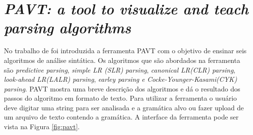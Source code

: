
\section{\textit{PAVT: a tool to visualize and teach parsing algorithms}}
No trabalho de \textcite{sangal2018pavt} foi introduzida a ferramenta PAVT com o objetivo de ensinar seis algoritmos de análise sintática. Os algoritmos que são abordados na ferramenta são \textit{predictive parsing}, \textit{simple LR (SLR) parsing}, \textit{canonical LR(CLR) parsing}, \textit{look-ahead LR(LALR) parsing}, \textit{earley parsing e Cocke-Younger-Kasami(CYK) parsing}. PAVT mostra uma breve descrição dos algoritmos e dá o resultado dos passos do algoritmo em formato de texto. Para utilizar a ferramenta o usuário deve digitar uma string para ser analisada e a gramática alvo ou fazer upload de um arquivo de texto contendo a gramática. A interface da ferramenta pode ser vista na Figura \ref{fig:pavt}.
\begin{figure}[ht]
  \captionsetup{width=16cm}
\end{figure}

